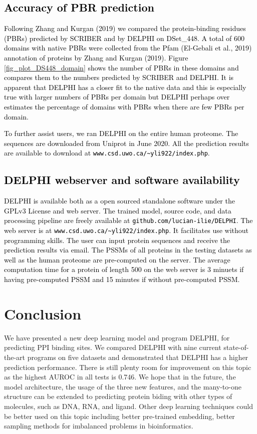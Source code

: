 \documentclass{bioinfo}
\newcommand{\mySecondColor}{black}
\begin{document}
\subsection{\textcolor{\mySecondColor}{Accuracy of PBR prediction}}
\textcolor{\mySecondColor}{Following Zhang and Kurgan (2019) we compared the protein-binding residues (PBRs) predicted by SCRIBER and by DELPHI on DSet\_448.  
A total of 600 domains with native PBRs were collected from the Pfam (El-Gebali et al., 2019) annotation of proteins by Zhang and Kurgan (2019).  
Figure \ref{fig_plot_DS448_domain} shows the number of PBRs in these domains and compares them to the numbers predicted by SCRIBER and DELPHI. 
It is apparent that DELPHI has a closer fit to the native data and this is especially 
true with larger numbers of PBRs per domain but DELPHI perhaps over estimates the percentage of domains with PBRs when there are few PBRs per domain.}

\textcolor{\mySecondColor}{
To further assist users, we ran DELPHI on the entire human proteome. The sequences are downloaded from Uniprot in June 2020. All the prediction results are available to download at \texttt{www.csd.uwo.ca/\textasciitilde{}yli922/index.php}.
}




\subsection{\textcolor{\mySecondColor}{DELPHI webserver and software availability}}
\textcolor{\mySecondColor}{DELPHI is available both as a open sourced standalone software under the GPLv3 License and web server. The trained model, source code, and data processing pipeline are freely available at \texttt{github.com/lucian-ilie/DELPHI}. The web server is at  \texttt{www.csd.uwo.ca/\textasciitilde{}yli922/index.php}.
It facilitates use without programming skills. The user can input protein sequences and receive the prediction results via email. The PSSMs of all proteins in the testing datasets as well as the human proteome are pre-computed on the server. The average computation time for a protein of length 500 on the web server is 3 minuets if having pre-computed PSSM and 15 minutes if without pre-computed PSSM.
}


\section{Conclusion}
We have presented a new deep learning model and program DELPHI, for predicting PPI binding sites. We compared DELPHI with nine current state-of-the-art programs on five datasets and demonstrated that DELPHI has a higher prediction performance. There is still plenty room for improvement on this topic as the highest AUROC in all tests is 0.746. 
We hope that in the future, the model architecture, the usage of the three new features, and the many-to-one structure can be extended to predicting protein biding with other types of molecules, such as DNA, RNA, and ligand. Other deep learning techniques could be better used on this topic including better pre-trained embedding, better sampling methods for imbalanced problems in bioinformatics. 
\end{document}
